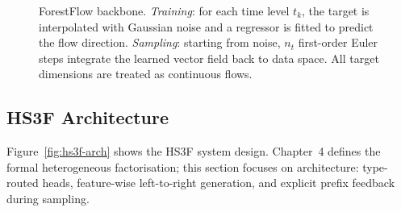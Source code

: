 \begin{figure}[htbp]
\caption{ForestFlow backbone. \textit{Training}: for each time level $t_k$, the target is interpolated with Gaussian noise and a regressor is fitted to predict the flow direction. \textit{Sampling}: starting from noise, $n_t$ first-order Euler steps integrate the learned vector field back to data space. All target dimensions are treated as continuous flows.}
\label{fig:forestflow-arch}
\end{figure}

\subsection{HS3F Architecture}

Figure~\ref{fig:hs3f-arch} shows the HS3F system design. Chapter~4 defines the formal heterogeneous factorisation; this section focuses on architecture: type-routed heads, feature-wise left-to-right generation, and explicit prefix feedback during sampling.


